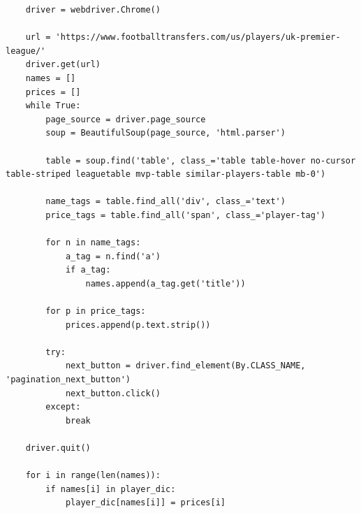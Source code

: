 \documentclass[12pt]{report}
\begin{document}
{{{\begin{lstlisting}
    driver = webdriver.Chrome()

    url = 'https://www.footballtransfers.com/us/players/uk-premier-league/'
    driver.get(url)
    names = []
    prices = []
    while True:
        page_source = driver.page_source
        soup = BeautifulSoup(page_source, 'html.parser')

        table = soup.find('table', class_='table table-hover no-cursor table-striped leaguetable mvp-table similar-players-table mb-0')

        name_tags = table.find_all('div', class_='text')
        price_tags = table.find_all('span', class_='player-tag')

        for n in name_tags:
            a_tag = n.find('a')
            if a_tag:
                names.append(a_tag.get('title'))

        for p in price_tags:
            prices.append(p.text.strip())

        try:
            next_button = driver.find_element(By.CLASS_NAME, 'pagination_next_button')
            next_button.click()
        except:
            break

    driver.quit()

    for i in range(len(names)):
        if names[i] in player_dic:
            player_dic[names[i]] = prices[i]


\end{lstlisting}}}}
\end{document}
